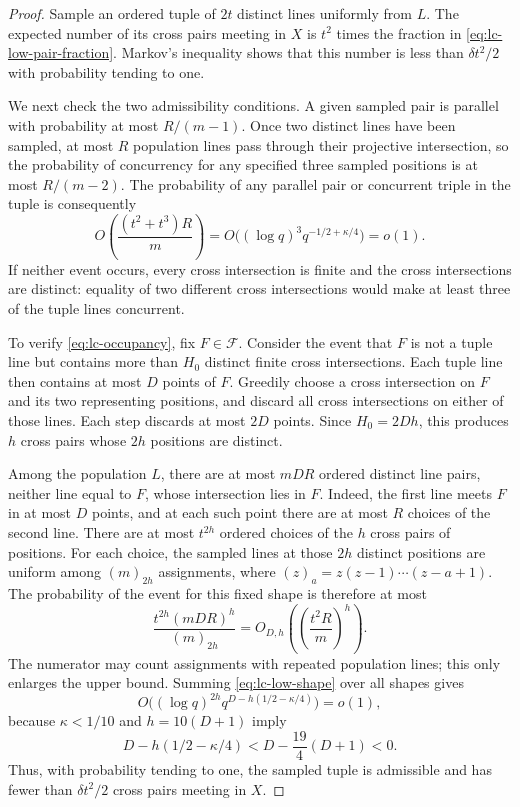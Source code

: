\begin{proof}
Sample an ordered tuple of $2t$ distinct lines uniformly from $L$.
The expected number of its cross pairs meeting in $X$ is $t^2$ times
the fraction in \eqref{eq:lc-low-pair-fraction}. Markov's inequality
shows that this number is less than $\delta t^2/2$ with probability
tending to one.

We next check the two admissibility conditions. A given sampled pair
is parallel with probability at most $R/(m-1)$. Once two distinct
lines have been sampled, at most $R$ population lines pass through
their projective intersection, so the probability of concurrency for
any specified three sampled positions is at most $R/(m-2)$. The
probability of any parallel pair or concurrent triple in the tuple
is consequently
\begin{equation}\label{eq:lc-low-degeneracy}
 O\left(\frac{(t^2+t^3)R}{m}\right)
 =O\bigl((\log q)^3q^{-1/2+\kappa/4}\bigr)=o(1).
\end{equation}
If neither event occurs, every cross intersection is finite and the
cross intersections are distinct: equality of two different cross
intersections would make at least three of the tuple lines concurrent.

To verify \eqref{eq:lc-occupancy}, fix $F\in\mathcal F$. Consider the
event that $F$ is not a tuple line but contains more than $H_0$ distinct
finite cross intersections. Each tuple line then contains at most
$D$ points of $F$. Greedily choose a cross intersection on $F$ and its
two representing positions, and discard all cross intersections on
either of those lines. Each step discards at most $2D$ points. Since
$H_0=2Dh$, this produces $h$ cross pairs whose $2h$ positions are
distinct.

Among the population $L$, there are at most $mDR$ ordered distinct
line pairs, neither line equal to $F$, whose intersection lies in
$F$. Indeed, the first line meets $F$ in at most $D$ points, and at
each such point there are at most $R$ choices of the second line.
There are at most $t^{2h}$ ordered choices of the $h$ cross pairs of
positions. For each choice, the sampled lines at those $2h$ distinct
positions are uniform among $(m)_{2h}$ assignments, where
$(z)_a=z(z-1)\cdots(z-a+1)$. The probability of the event for this
fixed shape is therefore at most
\begin{equation}\label{eq:lc-low-shape}
 \frac{t^{2h}(mDR)^h}{(m)_{2h}}
 =O_{D,h}\left(\left(\frac{t^2R}{m}\right)^h\right).
\end{equation}
The numerator may count assignments with repeated population lines;
this only enlarges the upper bound. Summing
\eqref{eq:lc-low-shape} over all shapes gives
\[
 O\bigl((\log q)^{2h}q^{D-h(1/2-\kappa/4)}\bigr)=o(1),
\]
because $\kappa<1/10$ and $h=10(D+1)$ imply
\[
 D-h(1/2-\kappa/4)
 <D-\frac{19}{4}(D+1)<0.
\]
Thus, with probability tending to one, the sampled tuple is admissible
and has fewer than $\delta t^2/2$ cross pairs meeting in $X$.


\end{proof}
